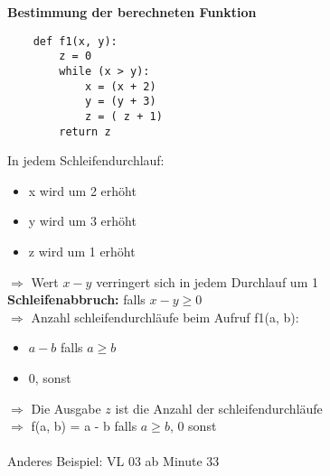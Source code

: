 \documentclass{article}
\begin{document}
\textbf{Bestimmung der berechneten Funktion}
\begin{lstlisting}
    def f1(x, y):
        z = 0
        while (x > y):
            x = (x + 2)
            y = (y + 3)
            z = ( z + 1)
        return z
\end{lstlisting}

In jedem Schleifendurchlauf: 
\begin{itemize}
    \item x wird um 2 erhöht
    \item y wird um 3 erhöht
    \item z wird um 1 erhöht
\end{itemize}
$\Rightarrow$ Wert $x - y$ verringert sich in jedem Durchlauf
um 1 \\
\textbf{Schleifenabbruch:} falls $x - y \geq 0$ \\
$\Rightarrow$ Anzahl schleifendurchläufe beim Aufruf f1(a, b): \\
\begin{itemize}
    \item $a - b$ falls $a \geq b$
    \item $0$, sonst
\end{itemize}
$\Rightarrow$ Die Ausgabe $z$ ist die Anzahl der schleifendurchläufe \\
$\Rightarrow$ f(a, b) = a - b falls $a \geq b$, 0 sonst\\
\\
Anderes Beispiel: VL 03 ab Minute 33
\end{document}

